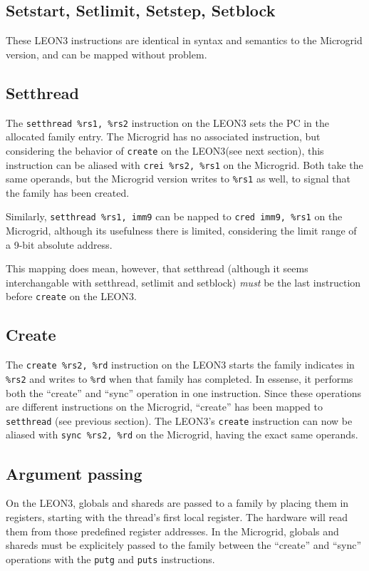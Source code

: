 \documentclass[a4paper,11pt]{article}
\newcommand{\leon}{{LEON3}\xspace}
\begin{document}
\subsection{Setstart, Setlimit, Setstep, Setblock}
These \leon instructions are identical in syntax and semantics to the Microgrid version, and can be mapped without problem.

\subsection{Setthread}
The {\tt setthread \%rs1, \%rs2} instruction on the \leon sets the PC in the allocated family entry. The Microgrid has no associated instruction, but considering the behavior of {\tt create} on the \leon (see next section), this instruction can be aliased with {\tt crei \%rs2, \%rs1} on the Microgrid. Both take the same operands, but the Microgrid version writes to {\tt \%rs1} as well, to signal that the family has been created.

Similarly, {\tt setthread \%rs1, imm9} can be napped to {\tt cred imm9, \%rs1} on the Microgrid, although its usefulness there is limited, considering the limit range of a 9-bit absolute address.

This mapping does mean, however, that setthread (although it seems interchangable with setthread, setlimit and setblock) \emph{must} be the last instruction before {\tt create} on the \leon.

\subsection{Create}
The {\tt create \%rs2, \%rd} instruction on the \leon starts the family indicates in {\tt \%rs2} and writes to {\tt \%rd} when that family has completed. In essense, it performs both the ``create'' and ``sync'' operation in one instruction. Since these operations are different instructions on the Microgrid, ``create'' has been mapped to {\tt setthread} (see previous section). The \leon's {\tt create} instruction can now be aliased with {\tt sync \%rs2, \%rd} on the Microgrid, having the exact same operands.

\subsection{Argument passing}
On the \leon, globals and shareds are passed to a family by placing them in registers, starting with the thread's first local register. The hardware will read them from those predefined register addresses. In the Microgrid, globals and shareds must be explicitely passed to the family between the ``create'' and ``sync'' operations with the {\tt putg} and {\tt puts} instructions.
\end{document}
